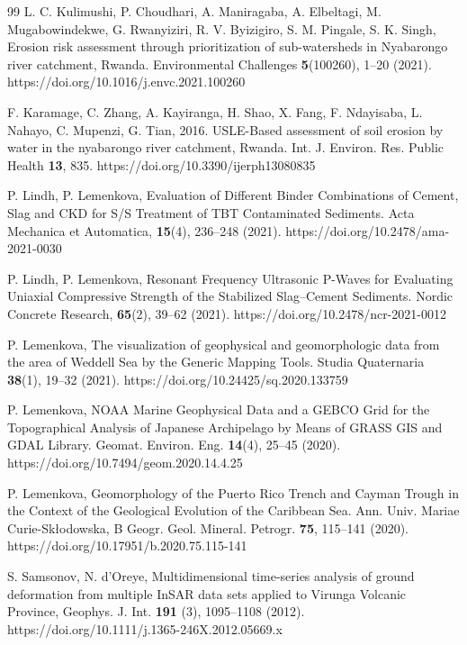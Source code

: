 \documentclass[myclassdoc,debug]{rjparticle}
\begin{document}
\begin{thebibliography}{99}
L. C. Kulimushi, P. Choudhari, A. Maniragaba, A. Elbeltagi, M. Mugabowindekwe, G. Rwanyiziri, R. V. Byizigiro,  S. M. Pingale, S. K. Singh, Erosion risk assessment through prioritization of sub-watersheds in Nyabarongo river catchment, Rwanda. Environmental Challenges \textbf{5}(100260), 1--20 (2021). https://doi.org/10.1016/j.envc.2021.100260

F. Karamage, C. Zhang, A. Kayiranga, H. Shao, X. Fang, F. Ndayisaba, L. Nahayo,  C. Mupenzi, G. Tian, 2016. USLE-Based assessment of soil erosion by water in the  nyabarongo river catchment, Rwanda. Int. J. Environ. Res. Public Health \textbf{13}, 835. https://doi.org/10.3390/ijerph13080835

P. Lindh, P. Lemenkova, Evaluation of Different Binder Combinations of Cement, Slag and CKD for S/S Treatment of TBT Contaminated Sediments. Acta Mechanica et Automatica, \textbf{15}(4), 236--248 (2021). https://doi.org/10.2478/ama-2021-0030

P. Lindh, P. Lemenkova, Resonant Frequency Ultrasonic P-Waves for Evaluating Uniaxial Compressive Strength of the Stabilized Slag–Cement Sediments. Nordic Concrete Research, \textbf{65}(2), 39--62 (2021). https://doi.org/10.2478/ncr-2021-0012

P. Lemenkova, The visualization of geophysical and geomorphologic data from the area of Weddell Sea by the Generic Mapping Tools. Studia Quaternaria \textbf{38}(1), 19--32 (2021). https://doi.org/10.24425/sq.2020.133759 

P. Lemenkova, NOAA Marine Geophysical Data and a GEBCO Grid for the Topographical Analysis of Japanese Archipelago by Means of GRASS GIS and GDAL Library. Geomat. Environ. Eng. \textbf{14}(4), 25--45 (2020). https://doi.org/10.7494/geom.2020.14.4.25 

P. Lemenkova, Geomorphology of the Puerto Rico Trench and Cayman Trough in the Context of the Geological Evolution of the Caribbean Sea. Ann. Univ. Mariae Curie-Skłodowska, B Geogr. Geol. Mineral. Petrogr. \textbf{75}, 115--141 (2020). https://doi.org/10.17951/b.2020.75.115-141 

S. Samsonov, N. d'Oreye, Multidimensional time-series analysis of ground deformation from multiple InSAR data sets applied to Virunga Volcanic Province, Geophys. J. Int. \textbf{191} (3), 1095--1108 (2012). https://doi.org/10.1111/j.1365-246X.2012.05669.x


\end{thebibliography}
\end{document}
